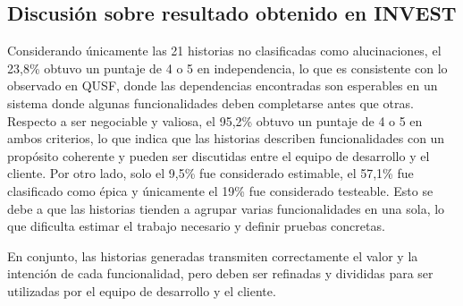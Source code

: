 


\subsection{Discusión sobre resultado obtenido en INVEST}

Considerando únicamente las 21 historias no clasificadas como alucinaciones, el 23,8\% obtuvo un puntaje de 4 o 5 en independencia, lo que es consistente con lo observado en QUSF, donde las dependencias encontradas son esperables en un sistema donde algunas funcionalidades deben completarse antes que otras. Respecto a ser negociable y valiosa, el 95,2\% obtuvo un puntaje de 4 o 5 en ambos criterios, lo que indica que las historias describen funcionalidades con un propósito coherente y pueden ser discutidas entre el equipo de desarrollo y el cliente. Por otro lado, solo el 9,5\% fue considerado estimable, el 57,1\% fue clasificado como épica y únicamente el 19\% fue considerado testeable. Esto se debe a que las historias tienden a agrupar varias funcionalidades en una sola, lo que dificulta estimar el trabajo necesario y definir pruebas concretas.

En conjunto, las historias generadas transmiten correctamente el valor y la intención de cada funcionalidad, pero deben ser refinadas y divididas para ser utilizadas por el equipo de desarrollo y el cliente.


